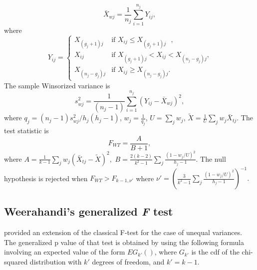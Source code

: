 \begin{equation*}
\bar{X}_{wj}=\frac{1}{n_j}\sum_{i=1}^{n_j}Y_{ij},
\end{equation*}
\noindent where
\begin{equation*}
Y_{ij} =
\begin{cases}
X_{(g_{j}+1)j} & \text{if  $X_{ij}  \leq X_{(g_j+1)j}$ },\\
X_{ij} & \text{if $X_{(g_j+1)j}< X_{ij}< X_{(n_j-g_j)j}$,}\\
X_{(n_j-g_j)j} & \text{if $X_{ij}\geq X_{(n_j-g_j)j}$.}
\end{cases}
\end{equation*}
The sample Winsorized variance is
\begin{equation*}
s_{wj}^2=\frac{1}{(n_j-1)}\sum_{i=1}^{n_j}(Y_{ij}-\bar{X}_{wj})^2,
\end{equation*} 
where 
\begin{math}
q_j={(n_j-1)s_{wj}^2}/{h_j(h_j-1)}
\end{math},
\begin{math}
w_j=\frac{1}{q_j}
\end{math},
\begin{math}
U=\sum_{j}w_j
\end{math},
\begin{math}
\tilde{X}=\frac{1}{U}\sum_{j}w_j\bar{X}_{tj}
\end{math}.
The test statistic is
\begin{equation}\label{Welch2}
F_{WT}=\frac{A}{B+1},
\end{equation}
where
\begin{math}
A=\frac{1}{k-1}\sum_{j}w_j(\bar{X}_{tj}-\tilde{X})^2,
\end{math}
\begin{math}
B=\frac{2(k-2)}{k^2-1}\sum_{j}\frac{(1-w_j/U)^2}{h_j-1}
\end{math}.
The null hypothesis is rejected when \begin{math} F_{WT}>F_{k-1,\nu'} \end{math} where \begin{math}
\nu' =\left(\frac{3}{k^2-1}\sum_j \frac{(1-w_j/U)^2}{h_j-1}  \right)^{-1}.
\end{math}


\subsection{Weerahandi's generalized \textit{F} test}
\cite{weerahandi1995} provided an extension of the classical F-test for the case of unequal variances. The generalized p value of that test is obtained by using the following formula involving an expected value of the form $EG_{k'} ()$, where $G_{k'}$ is the cdf of the chi-squared distribution with $k'$ degrees of freedom, and $k'=k-1$.

